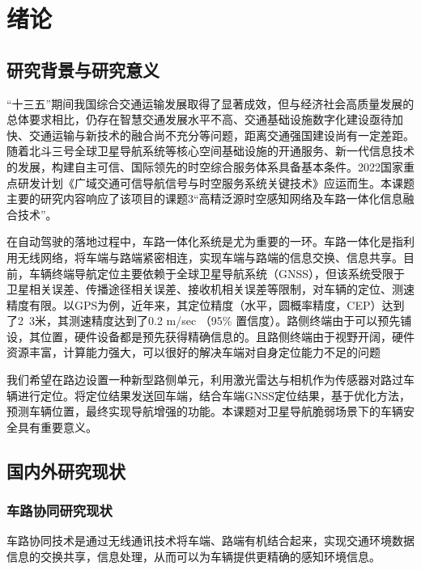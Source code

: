 \newpage
{}
\section{绪论}

\subsection{研究背景与研究意义}

“十三五”期间我国综合交通运输发展取得了显著成效，但与经济社会高质量发展的总体要求相比，仍存在智慧交通发展水平不高、交通基础设施数字化建设亟待加快、交通运输与新技术的融合尚不充分等问题，距离交通强国建设尚有一定差距。随着北斗三号全球卫星导航系统等核心空间基础设施的开通服务、新一代信息技术的发展，构建自主可信、国际领先的时空综合服务体系具备基本条件。2022国家重点研发计划《广域交通可信导航信号与时空服务系统关键技术》应运而生。本课题主要的研究内容响应了该项目的课题3“高精泛源时空感知网络及车路一体化信息融合技术”。

在自动驾驶的落地过程中，车路一体化系统是尤为重要的一环。车路一体化是指利用无线网络，将车端与路端紧密相连，实现车端与路端的信息交换、信息共享。目前，车辆终端导航定位主要依赖于全球卫星导航系统（GNSS），但该系统受限于卫星相关误差、传播途径相关误差、接收机相关误差等限制，对车辆的定位、测速精度有限。以GPS为例，近年来，其定位精度（水平，圆概率精度，CEP）达到了2~3米，其测速精度达到了0.2 m/sec （95\% 置信度）。路侧终端由于可以预先铺设，其位置，硬件设备都是预先获得精确信息的。且路侧终端由于视野开阔，硬件资源丰富，计算能力强大，可以很好的解决车端对自身定位能力不足的问题

我们希望在路边设置一种新型路侧单元，利用激光雷达与相机作为传感器对路过车辆进行定位。将定位结果发送回车端，结合车端GNSS定位结果，基于优化方法，预测车辆位置，最终实现导航增强的功能。本课题对卫星导航脆弱场景下的车辆安全具有重要意义。

\subsection{国内外研究现状}

\subsubsection{车路协同研究现状}

车路协同技术是通过无线通讯技术将车端、路端有机结合起来，实现交通环境数据信息的交换共享，信息处理，从而可以为车辆提供更精确的感知环境信息。

